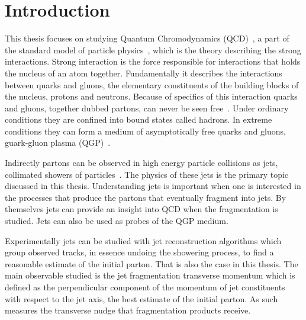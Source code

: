 
%
%
\tableofcontents

\clearpage
\section{Introduction}
\label{sec:introduction}
This thesis focuses on studying Quantum Chromodynamics (QCD)~\cite{gross1973asymptotically}, a part of the standard model of particle physics~\cite{Tanabashi:2018oca}, which is the theory describing the strong interactions. Strong interaction is the force responsible for interactions that holds the nucleus of an atom together. Fundamentally it describes the interactions between quarks and gluons, the elementary constituents of the building blocks of the nucleus, protons and neutrons. Because of specifics of this interaction quarks and gluons, together dubbed partons, can never be seen free~\cite{Perl:2004qc}. Under ordinary conditions they are confined into bound states called hadrons. In extreme conditions they can form a medium of asymptotically free quarks and gluons, guark-gluon plasma (QGP)~\cite{Shuryak:1980}. %

Indirectly partons can be observed in high energy particle collisions as jets, collimated showers of particles~\cite{Perkins:1982xb}. The physics of these jets is the primary topic discussed in this thesis. Understanding jets is important when one is interested in the processes that produce the partons that eventually fragment into jets. By themselves jets can provide an insight into QCD when the fragmentation is studied. Jets can also be used as probes of the QGP medium. 

Experimentally jets can be studied with jet reconstruction algorithms which group observed tracks, in essence undoing the showering process, to find a reasonable estimate of the initial parton. That is also the case in this thesis. The main observable studied is the jet fragmentation transverse momentum \jt{} which is defined as the perpendicular component of the momentum of jet constituents with respect to the jet axis, the best estimate of the initial parton. As such \jt{} measures the transverse nudge that fragmentation products receive.

